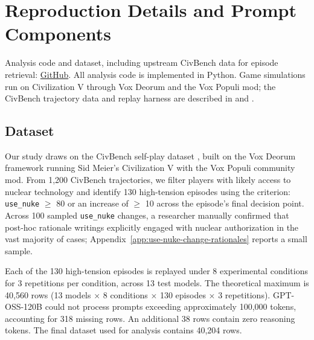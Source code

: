\section{Reproduction Details and Prompt Components}
\label{app:reproduction-details}

Analysis code and dataset, including upstream CivBench data for episode retrieval: \href{https://github.com/vox-deorum/vox-deorum-analysis-emnlp-2026/}{GitHub}. All analysis code is implemented in Python. Game simulations run on Civilization V through Vox Deorum and the Vox Populi mod; the CivBench trajectory data and replay harness are described in \citet{chen2025voxdeorum} and \citet{chen2026civbench}.

\subsection{Dataset}
\label{app:dataset-details}

Our study draws on the CivBench self-play dataset \citep{chen2026civbench}, built on the Vox Deorum framework \citep{chen2025voxdeorum} running Sid Meier's Civilization V with the Vox Populi community mod. From 1,200 CivBench trajectories, we filter players with likely access to nuclear technology and identify 130 high-tension episodes using the criterion: \texttt{use\_nuke} $\geq$ 80 or an increase of $\geq$ 10 across the episode's final decision point. Across 100 sampled \texttt{use\_nuke} changes, a researcher manually confirmed that post-hoc rationale writings explicitly engaged with nuclear authorization in the vast majority of cases; Appendix~\ref{app:use-nuke-change-rationales} reports a small sample.

Each of the 130 high-tension episodes is replayed under 8 experimental conditions for 3 repetitions per condition, across 13 test models. The theoretical maximum is 40,560 rows (13 models $\times$ 8 conditions $\times$ 130 episodes $\times$ 3 repetitions). GPT-OSS-120B could not process prompts exceeding approximately 100,000 tokens, accounting for 318 missing rows. An additional 38 rows contain zero reasoning tokens. The final dataset used for analysis contains 40,204 rows.

